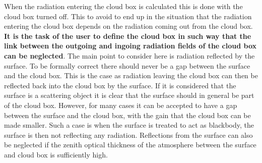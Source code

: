 When the radiation entering the cloud box is calculated this is done
with the cloud box turned off. This to avoid to end up in the
situation that the radiation entering the cloud box depends on the
radiation coming out from the cloud box. {\bf It is the task of the
  user to define the cloud box in such way that the link between the
  outgoing and ingoing radiation fields of the cloud box can be
  neglected}. The main point to consider here is radiation reflected
by the surface. To be formally correct there should never be a gap
between the surface and the cloud box. This is the case as radiation
leaving the cloud box can then be reflected back into the cloud box by
the surface. If it is considered that the surface is a scattering object
it is clear that the surface should in general be part of the cloud
box. However, for many cases it can be accepted to have a gap between
the surface and the cloud box, with the gain that the cloud box can be
made smaller. Such a case is when the surface is treated to act as
blackbody, the surface is then not reflecting any radiation.
Reflections from the surface can also be neglected if the zenith
optical thickness of the atmosphere between the surface and cloud box
is sufficiently high.


